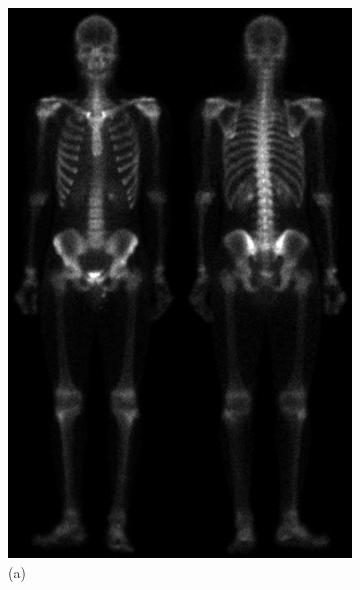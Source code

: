 \begin{figure}[h!]
	\centering
	\begin{subfigure}[b]{0.4\linewidth}
		\includegraphics[width=\linewidth]{myfigure/p2/2-a.png}
		\caption*{(a)}
		\label{fig:2a}
	\end{subfigure}
	\begin{subfigure}[b]{0.4\linewidth}

\end{subfigure}
\end{figure}
